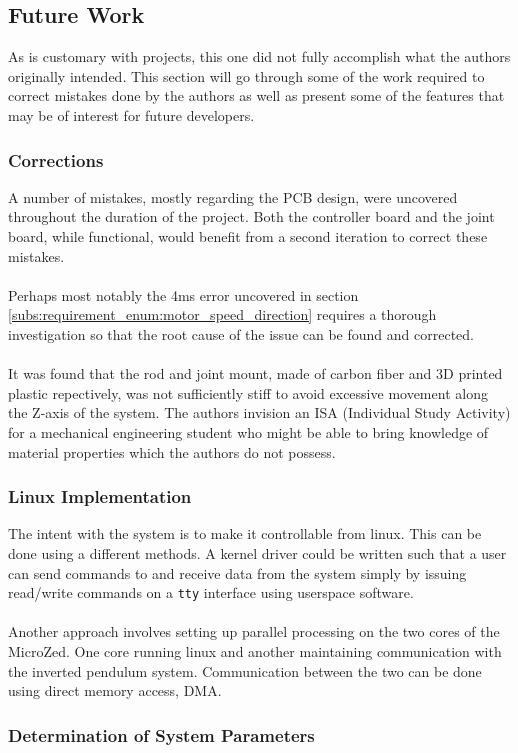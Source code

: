 \subsection{Future Work}
\label{sub:future_work}
As is customary with projects, this one did not fully accomplish what the authors originally intended.
This section will go through some of the work required to correct mistakes done by the authors as well as present some of the features that may be of interest for future developers.

\subsubsection{Corrections} %
\label{ssub:corrections}
A number of mistakes, mostly regarding the PCB design, were uncovered throughout the duration of the project.
Both the controller board and the joint board, while functional, would benefit from a second iteration to correct these mistakes.
\\~\\
Perhaps most notably the 4ms error uncovered in section \ref{subs:requirement_enum:motor_speed_direction} requires a thorough investigation so that the root cause of the issue can be found and corrected. 
\\~\\
It was found that the rod and joint mount, made of carbon fiber and 3D printed plastic repectively, was not sufficiently stiff to avoid excessive movement along the Z-axis of the system.
The authors invision an ISA (Individual Study Activity) for a mechanical engineering student who might be able to bring knowledge of material properties which the authors do not possess.
\subsubsection{Linux Implementation} %
\label{ssub:linux_implementation}
The intent with the system is to make it controllable from linux.
This can be done using a different methods.
A kernel driver could be written such that a user can send commands to and receive data from the system simply by issuing read/write commands on a \texttt{tty} interface using userspace software.
\\~\\
Another approach involves setting up parallel processing on the two cores of the MicroZed.
One core running linux and another maintaining communication with the inverted pendulum system.
Communication between the two can be done using direct memory access, DMA.
\subsubsection{Determination of System Parameters} %
\label{ssub:determination_of_system_parameters}

